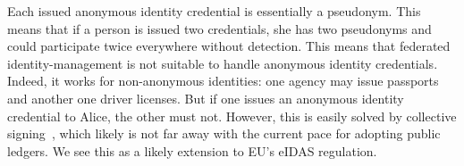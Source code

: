 Each issued anonymous identity credential is essentially a pseudonym.
This means that if a person is issued two credentials, she has two pseudonyms 
and could participate twice everywhere without detection.
This means that federated identity-management is not suitable to handle 
anonymous identity credentials.
Indeed, it works for non-anonymous identities: one agency may issue passports 
and another one driver licenses.
But if one issues an anonymous identity credential to Alice, the other must 
not.
However, this is easily solved by collective signing~\cite{collective-signing}, 
which likely is not far away with the current pace for adopting public ledgers.
We see this as a likely extension to EU's eIDAS regulation.


%
%
%

